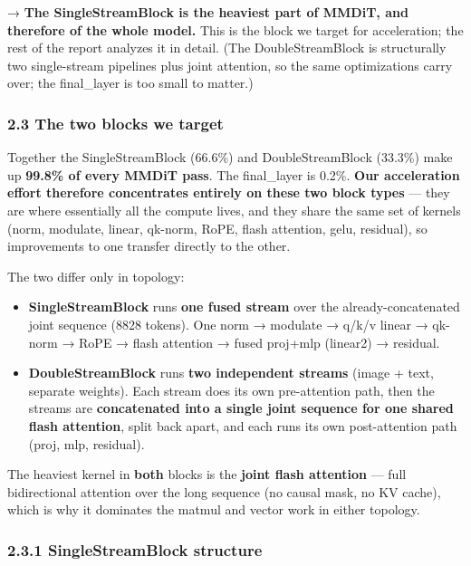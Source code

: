 \documentclass[
  10pt,
]{article}
\providecommand{\tightlist}{%
  \setlength{\itemsep}{0pt}\setlength{\parskip}{0pt}}
\begin{document}
→ \textbf{The SingleStreamBlock is the heaviest part of MMDiT, and
therefore of the whole model.} This is the block we target for
acceleration; the rest of the report analyzes it in detail. (The
DoubleStreamBlock is structurally two single-stream pipelines plus joint
attention, so the same optimizations carry over; the final\_layer is too
small to matter.)

\subsubsection{2.3 The two blocks we
target}\label{focus-the-single--and-double-stream-blocks}

Together the SingleStreamBlock (66.6\%) and DoubleStreamBlock (33.3\%)
make up \textbf{99.8\% of every MMDiT pass}. The final\_layer is 0.2\%.
\textbf{Our acceleration effort therefore concentrates entirely on these
two block types} --- they are where essentially all the compute lives,
and they share the same set of kernels (norm, modulate, linear, qk-norm,
RoPE, flash attention, gelu, residual), so improvements to one transfer
directly to the other.

The two differ only in topology:

\begin{itemize}
\tightlist
\item
  \textbf{SingleStreamBlock} runs \textbf{one fused stream} over the
  already-concatenated joint sequence (8828 tokens). One norm → modulate
  → q/k/v linear → qk-norm → RoPE → flash attention → fused proj+mlp
  (linear2) → residual.
\item
  \textbf{DoubleStreamBlock} runs \textbf{two independent streams}
  (image + text, separate weights). Each stream does its own
  pre-attention path, then the streams are \textbf{concatenated into a
  single joint sequence for one shared flash attention}, split back
  apart, and each runs its own post-attention path (proj, mlp,
  residual).
\end{itemize}

The heaviest kernel in \textbf{both} blocks is the \textbf{joint flash
attention} --- full bidirectional attention over the long sequence (no
causal mask, no KV cache), which is why it dominates the matmul and
vector work in either topology.

\subsubsection{2.3.1 SingleStreamBlock
structure}\label{singlestreamblock-structure}
\end{document}
